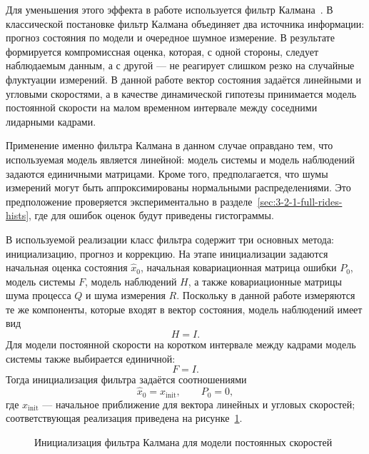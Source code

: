 Для уменьшения этого эффекта в работе используется фильтр Калмана~\cite{kalman-youtube,habr-kalman-pictures}. В классической постановке фильтр Калмана объединяет два источника информации: прогноз состояния по модели и очередное шумное измерение. В результате формируется компромиссная оценка, которая, с одной стороны, следует наблюдаемым данным, а с другой --- не реагирует слишком резко на случайные флуктуации измерений. В данной работе вектор состояния задаётся линейными и угловыми скоростями, а в качестве динамической гипотезы принимается модель постоянной скорости на малом временном интервале между соседними лидарными кадрами.

Применение именно фильтра Калмана в данном случае оправдано тем, что используемая модель является линейной: модель системы и модель наблюдений задаются единичными матрицами. Кроме того, предполагается, что шумы измерений могут быть аппроксимированы нормальными распределениями. Это предположение проверяется экспериментально в разделе~\ref{sec:3-2-1-full-rides-hists}, где для ошибок оценок будут приведены гистограммы.

В используемой реализации класс фильтра содержит три основных метода: инициализацию, прогноз и коррекцию. На этапе инициализации задаются начальная оценка состояния $\hat{x}_0$, начальная ковариационная матрица ошибки $P_0$, модель системы $F$, модель наблюдений $H$, а также ковариационные матрицы шума процесса $Q$ и шума измерения $R$. Поскольку в данной работе измеряются те же компоненты, которые входят в вектор состояния, модель наблюдений имеет вид
\begin{equation}
    H = I.
\end{equation}
Для модели постоянной скорости на коротком интервале между кадрами модель системы также выбирается единичной:
\begin{equation}
    F = I.
\end{equation}
Тогда инициализация фильтра задаётся соотношениями
\begin{equation}
    \hat{x}_0 = x_{\text{init}}, \qquad P_0 = 0,
\end{equation}
где $x_{\text{init}}$ --- начальное приближение для вектора линейных и угловых скоростей; соответствующая реализация приведена на рисунке~\ref{lst:kalman-init}.

\begin{figure}
  \fontsize{12pt}{14pt}\selectfont
  
  \caption{Инициализация фильтра Калмана для модели постоянных скоростей}
  \label{lst:kalman-init}
\end{figure}

